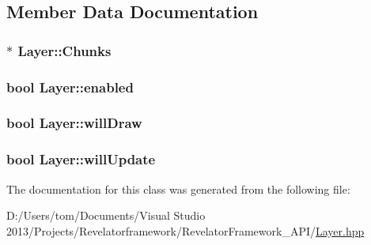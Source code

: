 \subsection{Member Data Documentation}
\hypertarget{class_layer_ab5408f6d27ad51d73df507296f16c811}{
\subsubsection[{Chunks}]{$\ast$ Layer\-::\-Chunks\hspace{0.3cm}{\ttfamily [protected]}}}\label{class_layer_ab5408f6d27ad51d73df507296f16c811}
\hypertarget{class_layer_af9f9c9a8c4a053bd829a06273df297bd}{
\subsubsection[{enabled}]{\setlength{\rightskip}{0pt plus 5cm}bool Layer\-::enabled\hspace{0.3cm}{\ttfamily [protected]}}}\label{class_layer_af9f9c9a8c4a053bd829a06273df297bd}
\hypertarget{class_layer_a64902a81921ba2fc792d044392b14ecc}{
\subsubsection[{will\-Draw}]{\setlength{\rightskip}{0pt plus 5cm}bool Layer\-::will\-Draw\hspace{0.3cm}{\ttfamily [protected]}}}\label{class_layer_a64902a81921ba2fc792d044392b14ecc}
\hypertarget{class_layer_a8c3badeb437135a265c931f4ee728a48}{
\subsubsection[{will\-Update}]{\setlength{\rightskip}{0pt plus 5cm}bool Layer\-::will\-Update\hspace{0.3cm}{\ttfamily [protected]}}}\label{class_layer_a8c3badeb437135a265c931f4ee728a48}


The documentation for this class was generated from the following file\-:\begin{DoxyCompactItemize}
\item 
D\-:/\-Users/tom/\-Documents/\-Visual Studio 2013/\-Projects/\-Revelatorframework/\-Revelator\-Framework\-\_\-\-A\-P\-I/\hyperlink{_layer_8hpp}{Layer.\-hpp}\end{DoxyCompactItemize}

